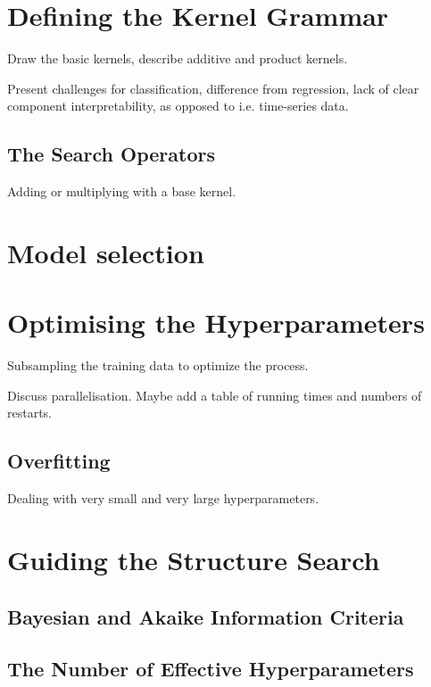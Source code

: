\documentclass[a4paper,12pt ]{report}
\begin{document}
\section{Defining the Kernel Grammar}

Draw the basic kernels, describe additive and product kernels. 

Present challenges for classification, difference from regression, lack of clear component interpretability, as opposed to i.e. time-series data. 

\subsection{The Search Operators}

Adding or multiplying with a base kernel. 

\section{Model selection}

\section{Optimising the Hyperparameters}

Subsampling the training data to optimize the process. 

Discuss parallelisation. Maybe add a table of running times and numbers of restarts. 

\subsection{Overfitting}

Dealing with very small and very large hyperparameters. 

\section{Guiding the Structure Search}

\subsection{Bayesian and Akaike Information Criteria}

\subsection{The Number of Effective Hyperparameters}
\end{document}
